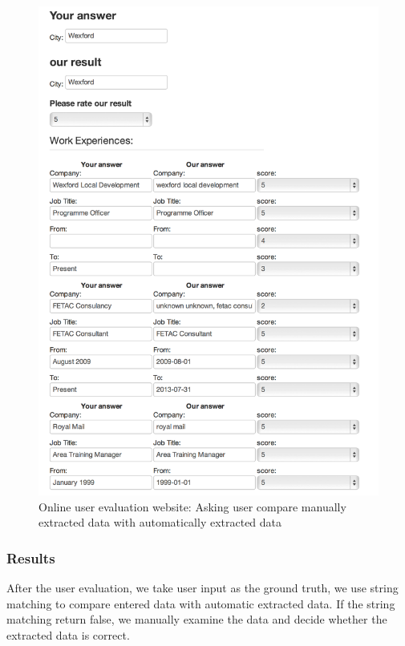 \begin{figure}[H]
	\centering
	\includegraphics[scale=0.8]{images/user-compare.png}
	\caption{Online user evaluation website: Asking user compare manually extracted data with automatically extracted data\protect}
	\label{fig:UserCompare}
\end{figure}

\subsubsection{Results}

After the user evaluation, we take user input as the ground truth, we use string matching to compare entered data with automatic extracted data. If the string matching return false, we manually examine the data and decide whether the extracted data is correct.


